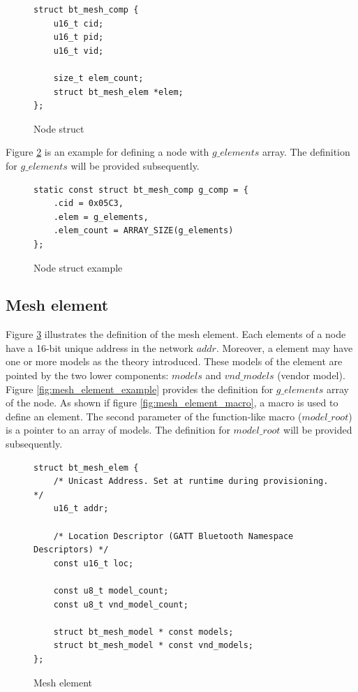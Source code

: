 \documentclass[\main/main.tex]{subfiles}
\begin{document}
\begin{figure}[H]
    \begin{lstlisting}[style=CStyle]
struct bt_mesh_comp {
	u16_t cid;
	u16_t pid;
	u16_t vid;

	size_t elem_count;
	struct bt_mesh_elem *elem;
};
    \end{lstlisting}
    \caption{Node struct}
    \label{fig:node_struct}
\end{figure}

Figure \ref{fig:node_struct_example} is an example for defining a node with $g\_elements$ array. The definition for  $g\_elements$ will be provided subsequently.
\begin{figure}[H]
    \begin{lstlisting}[style=CStyle]
static const struct bt_mesh_comp g_comp = {
    .cid = 0x05C3,
    .elem = g_elements,
    .elem_count = ARRAY_SIZE(g_elements)
};
    \end{lstlisting}
    \caption{Node struct example}
    \label{fig:node_struct_example}
\end{figure}

\subsection{Mesh element}
Figure \ref{fig:mesh_element} illustrates the definition of the mesh element. Each elements of a node have a 16-bit unique address in the network $addr$. Moreover, a element may have one or more models as the theory introduced. These models of the element are pointed by the two lower components: $models$ and $vnd\_models$ (vendor model). Figure \ref{fig:mesh_element_example} provides the definition for $g\_elements$ array of the node. As shown if figure \ref{fig:mesh_element_macro}, a macro is used to define an element. The second parameter of the function-like macro ($model\_root$) is a pointer to an array of models. The definition for  $model\_root$ will be provided subsequently.
\begin{figure}[H]
    \begin{lstlisting}[style=CStyle]
struct bt_mesh_elem {
    /* Unicast Address. Set at runtime during provisioning. */
    u16_t addr;

    /* Location Descriptor (GATT Bluetooth Namespace Descriptors) */
    const u16_t loc;

    const u8_t model_count;
    const u8_t vnd_model_count;

    struct bt_mesh_model * const models;
    struct bt_mesh_model * const vnd_models;
};
    \end{lstlisting}
    \caption{Mesh element}
    \label{fig:mesh_element}
\end{figure}
\end{document}
